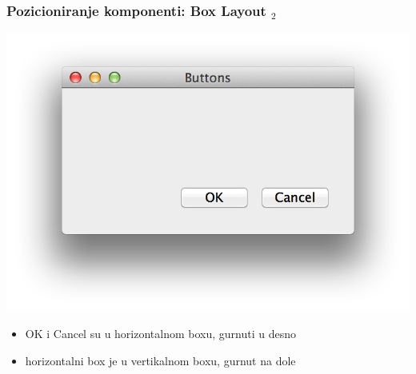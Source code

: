 \documentclass[utf8,compress,aspectratio=169]{beamer}
\begin{document}
\begin{frame}[fragile]
  \frametitle{Pozicioniranje komponenti: Box Layout $_2$}
\begin{center}
\includegraphics[scale=0.4]{pyqt06.png}
\end{center}
  \begin{itemize}
    \item OK i Cancel su u horizontalnom boxu, gurnuti u desno
    \item horizontalni box je u vertikalnom boxu, gurnut na dole
  \end{itemize}
\end{frame}
\end{document}
